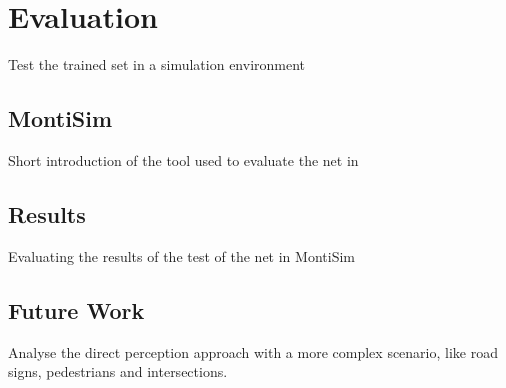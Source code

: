 \chapter{Evaluation}

Test the trained set in a simulation environment

\section{MontiSim}

Short introduction of the tool used to evaluate the net in \cite{MontiSim}

\section{Results}

Evaluating the results of the test of the net in MontiSim

\section{Future Work}

Analyse the direct perception approach with a more complex scenario, like road signs, pedestrians and intersections.
